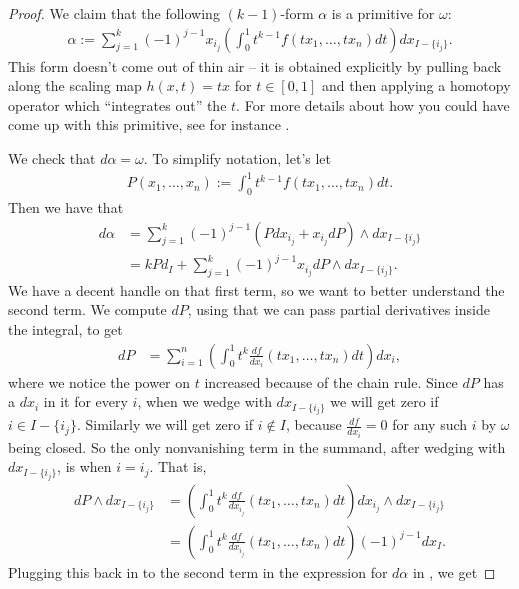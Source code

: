 \documentclass[11pt]{amsart}
\begin{document}
\begin{proof}
We claim that the following $(k-1)$-form $\alpha$ is a primitive for $\omega$:
\begin{align*}
    \alpha := \sum_{j=1}^k (-1)^{j-1} x_{i_j} \left( \int_0^1 t^{k-1} f(tx_1, \ldots, tx_n) dt \right) dx_{I\minus\{i_j\}}.
\end{align*}
This form doesn't come out of thin air -- it is obtained explicitly by pulling back along the scaling map $h(x,t) = tx$ for $t\in [0,1]$ and then applying a homotopy operator which ``integrates out'' the $t$. For more details about how you could have come up with this primitive, see for instance \cite[I\S4]{BottTu}.

We check that $d\alpha = \omega$. To simplify notation, let's let
\begin{align*}
    P(x_1, \ldots, x_n) := \int_0^1 t^{k-1} f(tx_1, \ldots, tx_n) dt.
\end{align*}
Then we have that
\begin{equation}\label{eqn:dalpha-1}
\begin{aligned}
    d\alpha &= \sum_{j=1}^k (-1)^{j-1} (P dx_{i_j} + x_{i_j} dP) \wedge dx_{I\minus\{i_j\}} \\
    &= kPd_I + \sum_{j=1}^k (-1)^{j-1}x_{i_j} dP\wedge dx_{I\minus\{i_j\}}.
\end{aligned}
\end{equation}
We have a decent handle on that first term, so we want to better understand the second term. We compute $dP$, using that we can pass partial derivatives inside the integral, to get
\begin{align*}
    dP &= \sum_{i=1}^n \left(\int_0^1 t^{k} \frac{df}{dx_i}(tx_1, \ldots, tx_n) dt\right)dx_i,
\end{align*}
where we notice the power on $t$ increased because of the chain rule. Since $dP$ has a $dx_i$ in it for every $i$, when we wedge with $dx_{I\minus\{i_j\}}$ we will get zero if $i \in I\minus\{i_j\}$. Similarly we will get zero if $i\notin I$, because $\frac{df}{dx_i} = 0$ for any such $i$ by $\omega$ being closed. So the only nonvanishing term in the summand, after wedging with $dx_{I\minus\{i_j\}}$, is when $i = i_j$. That is,
\begin{align*}
    dP \wedge dx_{I\minus\{i_j\}} &= \left(\int_0^1 t^k \frac{df}{dx_{i_j}}(tx_1, \ldots, tx_n) dt\right) dx_{i_j}\wedge dx_{I\minus\{i_j\}} \\
    &= \left(\int_0^1 t^k\frac{df}{dx_{i_j}}(tx_1, \ldots, tx_n)dt\right) (-1)^{j-1} dx_I.
\end{align*}
Plugging this back in to the second term in the expression for $d\alpha$ in , we get

\end{proof}
\end{document}
